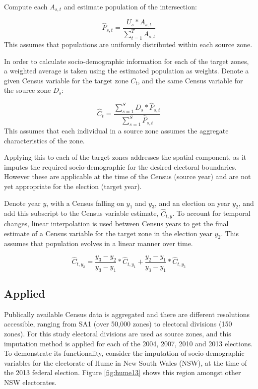 \documentclass[openany]{book}
\begin{document}
Compute each \(A_{s,t}\) and estimate population of the intersection:

\[\hat{P}_{s,t} = \frac{U_s*A_{s,t}}{\sum_{t=1}^T A_{s,t}}\]
This assumes that populations are uniformly distributed within each source zone.

In order to calculate socio-demographic information for each of the target zones, a weighted average is taken using the estimated population as weights. Denote a given Census variable for the target zone \(C_t\), and the same Census variable for the source zone \(D_s\):

\[\hat{C}_t = \frac{\sum_{s=1}^{S}{D_s*\hat{P}_{s,t}}}{\sum_{s=1}^{S}{\hat{P}_{s,t}}}\]
This assumes that each individual in a source zone assumes the aggregate characteristics of the zone.

Applying this to each of the target zones addresses the spatial component, as it imputes the required socio-demographic for the desired electoral boundaries. However these are applicable at the time of the Census (source year) and are not yet appropriate for the election (target year).

Denote year \(y\), with a Census falling on \(y_1\) and \(y_3\), and an election on year \(y_2\), and add this subscript to the Census variable estimate, \(\hat{C}_{t,y}\). To account for temporal changes, linear interpolation is used between Census years to get the final estimate of a Census variable for the target zone in the election year \(y_2\). This assumes that population evolves in a linear manner over time.

\[\hat{C}_{t,y_2} = \frac{y_3-y_2}{y_3-y_1}*\hat{C}_{t,y_1} + \frac{y_2-y_1}{y_3-y_1}*\hat{C}_{t,y_3}\]

\hypertarget{applied}{%
\subsection{Applied}\label{applied}}

Publically available Census data is aggregated and there are different resolutions accessible, ranging from SA1 (over 50,000 zones) to electoral divisions (150 zones). For this study electoral divisions are used as source zones, and this imputation method is applied for each of the 2004, 2007, 2010 and 2013 elections. To demonstrate its functionality, consider the imputation of socio-demographic variables for the electorate of Hume in New South Wales (NSW), at the time of the 2013 federal election. Figure \ref{fig:hume13} shows this region amongst other NSW electorates.
\end{document}
